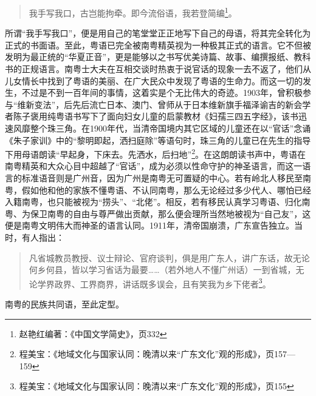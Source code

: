 \begin{quote}

我手写我口，古岂能拘牵。即今流俗语，我若登简编\footnote{赵艳红编著：《中国文学简史》，页332}。
\end{quote}

所谓“我手写我口”，便是用自己的笔堂堂正正地写下自己的母语，将其完全转化为正式的书面语。至此，粤语已完全被南粤精英视为一种极其正式的语言。它不但被发明为最正统的“华夏正音”，更是能够以之书写优美诗篇、故事、编撰报纸、教科书的正规语言。南粤士大夫在互相交谈时热衷于说官话的现象一去不返了，他们从儿女情长中找到了粤语的美丽、在广大民众中发现了粤语的生命力。而这一切的发生，不过是不到一百年间的事情，这着实是个无比伟大的奇迹。1903年，曾积极参与“维新变法”，后先后流亡日本、澳门、曾师从于日本维新旗手福泽谕吉的新会学者陈子褒用纯粤语书写下了面向妇女儿童的启蒙教材《妇孺三四五字经》，该书迅速风靡整个珠三角。在1900年代，当清帝国境内其它区域的儿童还在以“官话”念诵《朱子家训》中的“黎明即起，洒扫庭除”等语句时，珠三角的儿童已在先生的指导下用母语朗读“早起身，下床去。先洒水，后扫地”\footnote{程美宝：《地域文化与国家认同：晚清以来“广东文化”观的形成》，页157—159}。在这朗朗读书声中，粤语在南粤精英和大众心目中超越了“官话”，成为必须以性命守护的神圣语言，而这一语言的标准语音则是广州音，因为广州是南粤无可置疑的中心。若有岭北人移民至南粤，假如他和他的家族不懂粤语、不认同南粤，那么无论经过多少代人、哪怕已经入籍南粤，也只能被视为“捞头”、“北佬”。相反，若有移民认真学习粤语、归化南粤、为保卫南粤的自由与尊严做出贡献，那么便会理所当然地被视为“自己友”，这便是南粤文明伟大而神圣的语言认同。1911年，清帝国崩溃，广东宣告独立。当时，有人指出：

\begin{quote}
凡省城教员教授、议士辩论、官府谈判，俱是用广东人，讲广东话，故无论何乡何县，皆以学习省话为最要……（若外地人不懂广州话）一到省城，无论学界政界、工界商界，讲话既多误会，且有笑我为乡下佬者\footnote{程美宝：《地域文化与国家认同：晚清以来“广东文化”观的形成》，页155}。
\end{quote}

南粤的民族共同语，至此定型。














